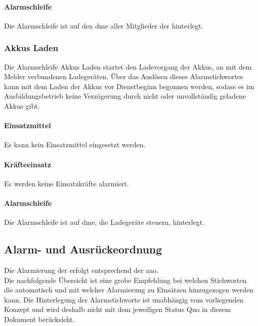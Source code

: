 \paragraph{Alarmschleife} Die Alarmschleife ist auf den \ac{dme} aller Mitglieder der \callee{} hinterlegt.

\subsubsection{Akkus Laden}

Die Alarmschleife \flq Akkus Laden\frq{} startet den Ladevorgang der Akkus, an mit dem Melder verbundenen Ladegeräten. Über das Auslösen dieses Alarmstichwortes kann mit dem Laden der Akkus vor Dienstbeginn begonnen werden, sodass es im Ausbildungsbetrieb keine Verzögerung durch nicht oder unvollständig geladene Akkus gibt.

\paragraph{Einsatzmittel} Es kann kein Einsatzmittel eingesetzt werden.

\paragraph{Kräfteeinsatz} Es werden keine Einsatzkräfte alarmiert.

\paragraph{Alarmschleife} Die Alarmschleife ist auf \ac{dme}, die Ladegeräte steuern, hinterlegt.

\subsection{Alarm- und Ausrückeordnung}

Die Alarmierung der \callee{} erfolgt entsprechend der \ac{aao}.\\

\noindent Die nachfolgende Übersicht ist eine grobe Empfehlung bei welchen Stichworten die \callee{} automatisch und mit welcher Alarmierung zu Einsätzen hinzugezogen werden kann. Die Hinterlegung der Alarmstichworte ist unabhängig vom vorliegenden Konzept und wird deshalb nicht mit dem jeweiligen Status Quo in diesem Dokument berücksicht.\\

